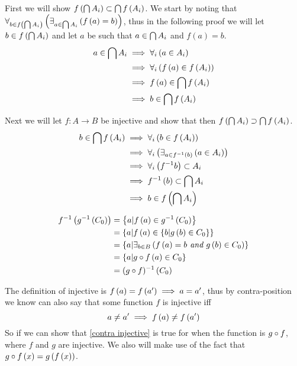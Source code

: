 \documentclass{article}
\begin{document}
 First we will show $f \left( \bigcap A_i \right)\subset\bigcap f \left( A_i \right)$. We start by noting that $\forall_{b\in f \left( \bigcap A_i \right)}\left( \exists_{a \in \bigcap A_i}\left( {f \left( a \right) = b} \right) \right)$, thus in the following proof we will let $b\in f \left( \bigcap A_i \right)$ and let $a$ be such that $a \in \bigcap A_i$ and $f(a) = b$.
\begin{align*}
a \in \bigcap A_i &\implies \forall_{i}\left( a\in A_i \right) \\
&\implies \forall_{i}\left( f \left( a \right) \in f \left( A_i \right) \right) \\
&\implies f \left( a \right) \in\bigcap f \left( A_i \right) \\
&\implies b \in \bigcap f \left( A_i \right)
\end{align*}

Next we will let $f:A\to B$ be injective and show that then $f \left( \bigcap A_i \right) \supset \bigcap f \left( A_i \right)$.
\begin{align*}
b\in\bigcap f \left( A_i \right) &\implies \forall_{i}\left( b\in f \left( A_i \right) \right) \\
&\implies \forall_{i}\left( \exists_{a\in f^{-1} \left( b \right)}\left( {a\in A_i} \right) \right) \\
&\implies \forall_{i}\left( f^{-1}b \right)\subset A_i \\
&\implies f^{-1} \left( b \right) \subset \bigcap A_i \\
&\implies b \in f \left( \bigcap A_i \right)
\end{align*}

\begin{align*}
f^{-1} \left( g^{-1} \left( C_0 \right) \right) &= \left\{ {a | f \left( a \right)\in g^{-1} \left( C_0 \right)} \right\} \\
&= \left\{ {a | f \left( a \right) \in\left\{ {b | g \left( b \right) \in C_0} \right\}} \right\} \\
&= \left\{ {a | \exists_{b\in B}\left( {f \left( a \right)=b \textit{ and } g \left( b \right)\in C_0} \right)} \right\} \\
&= \left\{ {a | g\circ f \left( a \right) \in C_0} \right\} \\
&= (g\circ f)^{-1} \left( C_0 \right)
\end{align*}

 The definition of injective is $f \left( a \right)=f \left( a' \right) \implies a = a'$, thus by contra-position we know can also say that some function $f$ is injective iff
\begin{equation}\label{contra injective}
a \not= a' \implies f \left( a \right) \not= f \left( a' \right)
\end{equation}
So if we can show that \eqref{contra injective} is true for when the function is $g\circ f$, where $f$ and $g$ are injective. We also will make use of the fact that $g\circ f \left( x \right)= g \left( f \left( x \right) \right)$.
\end{document}
